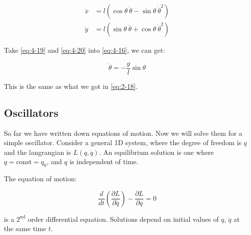 \begin{align}
    \label{eq:4-19}
    \ddot{x} &= l\left(\cos \theta \ \ddot{\theta} - \sin \theta \ \dot{\theta}^2\right) \\
    \label{eq:4-20}
    \ddot{y} &= l\left(\sin \theta \ \ddot{\theta} + \cos \theta \ \dot{\theta}^2\right)
\end{align}

Take \ref{eq:4-19} and \ref{eq:4-20} into \ref{eq:4-16}, we can get:

\begin{equation}
    \ddot{\theta} = -\frac{g}{l} \sin \theta
\end{equation}

This is the same as what we got in \ref{eq:2-18}.

\subsection{Oscillators}

So far we have written down equations of motion. Now we will solve them for a simple
oscillator. Consider a general 1D system, where the degree of freedom is $q$ and the 
langrangian is $L\left(q, \dot{q}\right)$. An equilibrium solution is one where 
$q = \text{const} = q_0$, and $q$ is independent of time.

The equation of motion:

\begin{equation}
    \frac{d}{dt} \left(\frac{\partial L}{\partial \dot{q}}\right) - \frac{\partial L}{\partial q} = 0
\end{equation}

is a $2^\text{nd}$ order differential equation. Solutions depend on initial values of 
$q$, $\dot{q}$ at the same time $t$.
